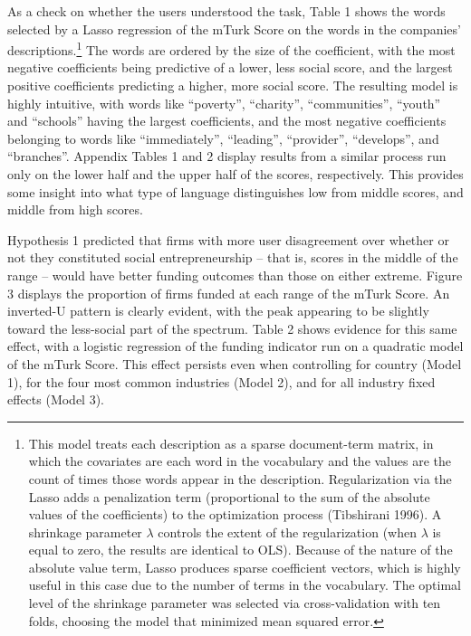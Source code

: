 \documentclass[12pt]{article}
\begin{document}
As a check on whether the users understood the task, Table 1 shows the words selected by a Lasso regression of the mTurk Score on the words in the companies' descriptions.\footnote{This model treats each description as a sparse document-term matrix, in which the covariates are each word in the vocabulary and the values are the count of times those words appear in the description. Regularization via the Lasso adds a penalization term (proportional to the sum of the absolute values of the coefficients) to the optimization process (Tibshirani 1996). A shrinkage parameter $\lambda$ controls the extent of the regularization (when $\lambda$ is equal to zero, the results are identical to OLS). Because of the nature of the absolute value term, Lasso produces sparse coefficient vectors, which is highly useful in this case due to the number of terms in the vocabulary.  The optimal level of the shrinkage parameter was selected via cross-validation with ten folds, choosing the model that minimized mean squared error.} The words are ordered by the size of the coefficient, with the most negative coefficients being predictive of a lower, less social score, and the largest positive coefficients predicting a higher, more social score. The resulting model is highly intuitive, with words like ``poverty'', ``charity'', ``communities'', ``youth'' and ``schools'' having the largest coefficients, and the most negative coefficients belonging to words like ``immediately'', ``leading'', ``provider'', ``develops'', and ``branches''. Appendix Tables 1 and 2 display results from a similar process run only on the lower half and the upper half of the scores, respectively. This provides some insight into what type of language distinguishes low from middle scores, and middle from high scores.

Hypothesis 1 predicted that firms with more user disagreement over whether or not they constituted social entrepreneurship -- that is, scores in the middle of the range -- would have better funding outcomes than those on either extreme. Figure 3 displays the proportion of firms funded at each range of the mTurk Score. An inverted-U pattern is clearly evident, with the peak appearing to be slightly toward the less-social part of the spectrum. Table 2 shows evidence for this same effect, with a logistic regression of the funding indicator run on a quadratic model of the mTurk Score. This effect persists even when controlling for country (Model 1), for the four most common industries (Model 2), and for all industry fixed effects (Model 3). 
\end{document}
